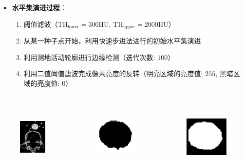 \begin{frame}
\begin{itemize}
  \item \textbf{水平集演进过程}：
  \begin{enumerate}
    \item 阈值滤波（$\text{TH}_{\text{lower}} = 300\text{HU}$, $\text{TH}_{\text{upper}} = 2000\text{HU}$）
    \item 从某一种子点开始，利用快速步进法进行的初始水平集演进
    \item 利用测地活动轮廓进行边缘检测（迭代次数: $100$）
    \item 利用二值阈值滤波完成像素亮度的反转（明亮区域的亮度值: $255$, 黑暗区域的亮度值: $0$）
  \end{enumerate}
\end{itemize}
\begin{columns}[b,onlytextwidth]
\begin{column}{.25\textwidth}
\begin{figure}[t]
\centering
\includegraphics[height=1.5in]{../../Figures/gac/dcm_threshold.eps}
\end{figure}
\end{column}
\begin{column}{.25\textwidth}
\begin{figure}[t]
\centering
\includegraphics[height=1.5in]{../../Figures/gac/dcm_fastMarching.eps}
\end{figure}
\end{column}
\begin{column}{.25\textwidth}
\begin{figure}[t]
\centering
\includegraphics[height=1.5in]{../../Figures/gac/dcm_out.eps}

\end{figure}
\end{column}
\end{columns}
\end{frame}
